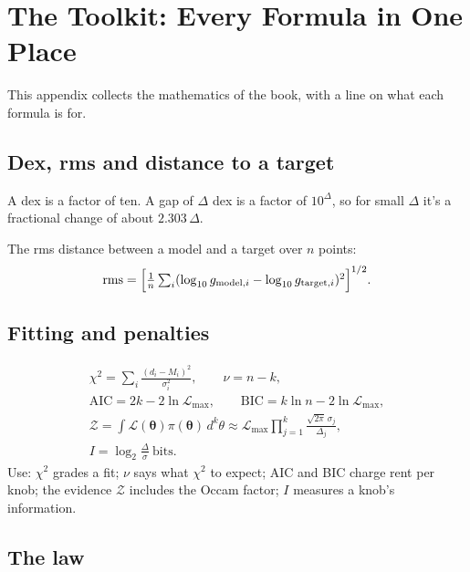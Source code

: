 \chapter{The Toolkit: Every Formula in One Place}

This appendix collects the mathematics of the book, with a line on what each formula is for.




\section{Dex, rms and distance to a target}

A dex is a factor of ten. A gap of $\Delta$ dex is a factor of $10^\Delta$, so for small $\Delta$ it's a fractional change of about $2.303\,\Delta$.


The rms distance between a model and a target over $n$ points:
\[
\mathrm{rms}=\Bigl[\tfrac1n\textstyle\sum_i(\log_{10}g_{{\rm model},i}-\log_{10}g_{{\rm target},i})^2\Bigr]^{1/2}.
\]

\section{Fitting and penalties}

\begin{gather*}
\chi^2=\sum_i\frac{(d_i-M_i)^2}{\sigma_i^2},\qquad\nu=n-k,\\
\mathrm{AIC}=2k-2\ln\mathcal L_{\max},\qquad\mathrm{BIC}=k\ln n-2\ln\mathcal L_{\max},\\
\mathcal Z=\int\mathcal L(\boldsymbol\theta)\pi(\boldsymbol\theta)\,d^k\theta\approx\mathcal L_{\max}\prod_{j=1}^k\frac{\sqrt{2\pi}\,\sigma_j}{\Delta_j},\\
I=\log_2\frac{\Delta}{\sigma}\ \text{bits}.
\end{gather*}
Use: $\chi^2$ grades a fit; $\nu$ says what $\chi^2$ to expect; AIC and BIC charge rent per knob; the evidence $\mathcal Z$ includes the Occam factor; $I$ measures a knob's information.

\section{The law}

